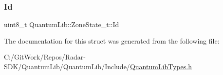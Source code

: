 \mbox{\label{struct_quantum_lib_1_1_zone_state__t_a7ccb0f763c97ad5cc8d1eaeefeef15bc}} 
\subsubsection{\texorpdfstring{Id}{Id}}
{\footnotesize\ttfamily uint8\+\_\+t Quantum\+Lib\+::\+Zone\+State\+\_\+t\+::\+Id}



The documentation for this struct was generated from the following file\+:\begin{DoxyCompactItemize}
\item 
C\+:/\+Git\+Work/\+Repos/\+Radar-\/\+S\+D\+K/\+Quantum\+Lib/\+Quantum\+Lib/\+Include/\mbox{\hyperlink{_quantum_lib_types_8h}{Quantum\+Lib\+Types.\+h}}\end{DoxyCompactItemize}
